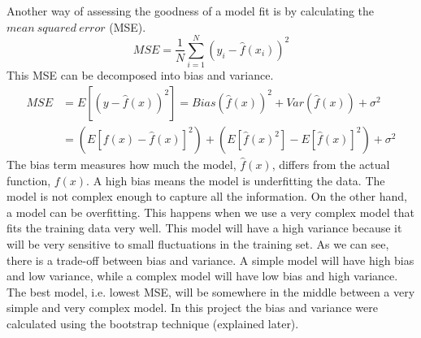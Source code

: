 \documentclass[12pt]{article}
\begin{document}
Another way of assessing the goodness of a model fit is by calculating the $mean\ squared\ error$ (MSE).
\begin{equation}
MSE = \frac{1}{N}\sum_{i=1}^{N}(y_i-\hat{f}(x_i))^2
\label{eq:MSE}
\end{equation}
This MSE can be decomposed into bias and variance.
\begin{equation}
\begin{split}
MSE &= E[(y-\hat{f}(x))^2] = Bias(\hat{f}(x))^2 + Var(\hat{f}(x)) + \sigma^2\\
&= (E[f(x)-\hat{f}(x)]^2) + (E[\hat{f}(x)^2]-E[\hat{f}(x)]^2) + \sigma^2
\end{split}
\end{equation}
The bias term measures how much the model, $\hat{f}(x)$, differs from the actual function, $f(x)$. A high bias means the model is underfitting the data. The model is not complex enough to capture all the information. On the other hand, a model can be overfitting. This happens when we use a very complex model that fits the training data very well. This model will have a high variance because it will be very sensitive to small fluctuations in the training set. As we can see, there is a trade-off between bias and variance. A simple model will have high bias and low variance, while a complex model will have low bias and high variance. The best model, i.e. lowest MSE, will be somewhere in the middle between a very simple and very complex model. In this project the bias and variance were calculated using the bootstrap technique (explained later).
\end{document}
